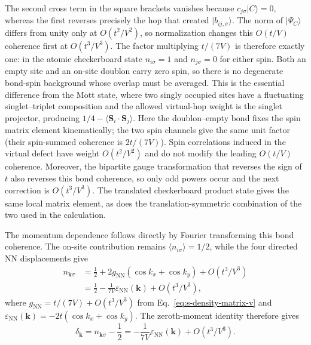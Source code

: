\documentclass[10pt]{article}
\newcommand{\epsk}{\varepsilon_{\mathrm{NN}}(\mathbf{k})}
\newcommand{\dk}{\delta_{\mathbf{k}}}
\begin{document}
The second cross term in the square brackets vanishes because
$c_{j\sigma}|C\rangle=0$, whereas the first reverses precisely the hop that
created $|b_{ij,\sigma}\rangle$.  The norm of $|\Psi_C\rangle$ differs from
unity only at $O(t^2/V^2)$, so normalization changes this $O(t/V)$
coherence first at $O(t^3/V^3)$.
The factor multiplying $t/(7V)$ is therefore exactly one: in the atomic
checkerboard state $n_{i\sigma}=1$ and $n_{j\sigma}=0$ for either spin.
Both an empty site and an on-site doublon carry zero spin, so there is no
degenerate bond-spin background whose overlap must be averaged. This is the
essential difference from the Mott state, where two singly occupied sites
have a fluctuating singlet--triplet composition and the allowed virtual-hop
weight is the singlet projector, producing
$1/4-\langle\mathbf S_i\!\cdot\!\mathbf S_j\rangle$. Here the doublon--empty
bond fixes the spin matrix element kinematically; the two spin channels give
the same unit factor (their spin-summed coherence is $2t/(7V)$). Spin
correlations induced in the virtual defect have weight $O(t^2/V^2)$ and do
not modify the leading $O(t/V)$ coherence. Moreover, the bipartite gauge
transformation that reverses the sign of $t$ also reverses this bond
coherence, so only odd powers occur and the next correction is
$O(t^3/V^3)$. The translated checkerboard product state gives the same local
matrix element, as does the translation-symmetric combination of the two used
in the calculation.

The momentum dependence follows directly by Fourier transforming this bond
coherence.  The on-site contribution remains
$\langle n_{i\sigma}\rangle=1/2$, while the four directed NN displacements
give
\begin{equation}
\begin{aligned}
n_{\mathbf k\sigma}
&=\frac12+2g_{\mathrm{NN}}(\cos k_x+\cos k_y)+O(t^3/V^3)\\
&=\frac12-\frac{1}{7V}\epsk+O(t^3/V^3),
\end{aligned}
\label{eq:s-nk-v}
\end{equation}
where $g_{\mathrm{NN}}=t/(7V)+O(t^3/V^3)$ from
Eq.~\ref{eq:s-density-matrix-v} and
$\epsk=-2t(\cos k_x+\cos k_y)$.  The zeroth-moment identity therefore gives
\begin{equation}
\dk=n_{\mathbf{k}\sigma}-\frac12
=-\frac{1}{7V}\epsk+O(t^3/V^3).
\label{eq:s-delta-v}
\end{equation}
\end{document}
